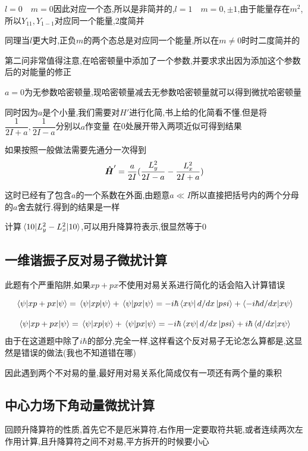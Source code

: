 \documentclass{article}
\begin{document}
            $l=0 \quad m=0$因此对应一个态,所以是非简并的,$ l = 1 \quad m =0,\pm 1 $,由于能量存在$m^{2}$,所以$Y_{11},Y_{1-1}$对应同一个能量,2度简并
            
            同理当$l$更大时,正负$m$的两个态总是对应同一个能量,所以在$m \neq 0$时时二度简并的
            
            第二问非常值得注意,在哈密顿量中添加了一个参数,并要求求出因为添加这个参数后的对能量的修正

            $a=0$为无参数哈密顿量,现哈密顿量减去无参数哈密顿量就可以得到微扰哈密顿量

            同时因为$a$是个小量,我们需要对$H'$进行化简,书上给的化简看不懂.但是将$ \dfrac{1}{2I+a},\dfrac{1}{2I-a}$分别以$a$作变量
            在0处展开带入两项近似可得到结果

            如果按照一般做法需要先通分一次得到
            $$ \vu*{H}' = \frac{a}{2I} ( \frac{L_{y}^{2}}{2I-a} -  \frac{L_{x}^{2}}{2I+a}) $$
            
            这时已经有了包含$a$的一个系数在外面,由题意$a \ll I $所以直接把括号内的两个分母的$a$舍去就行.得到的结果是一样
            
            计算$ \mel{10}{L_{y}^{2} - L_{x}^{2}}{10} $,可以用升降算符表示,很显然等于0
        
        \subsection{一维谐振子反对易子微扰计算}
            此题有个严重陷阱,如果$xp+px$不使用对易关系进行简化的话会陷入计算错误

            $$ 
            \mel{\psi}{xp+px}{\psi} = \mel{\psi}{xp}{\psi}+\mel{\psi}{px}{\psi} 
            = -i\hbar \bra{x\psi}d/dx \ket{psi} + \bra{-i\hbar d/dx}\ket{x\psi} 
            $$

            $$
            \mel{\psi}{xp+px}{\psi} = \mel{\psi}{xp}{\psi}+\mel{\psi}{px}{\psi} 
            = -i\hbar \bra{x\psi}d/dx \ket{psi} + i \hbar \bra{d/dx}\ket{x\psi} 
            $$
            由于在这道题中除了$i \hbar$的部分,完全一样,这样看这个反对易子无论怎么算都是,这显然是错误的做法(我也不知道错在哪)

            因此遇到两个不对易的量,最好用对易关系化简成仅有一项还有两个量的乘积

        \subsection{中心力场下角动量微扰计算}
            回顾升降算符的性质,首先它不是厄米算符,右作用一定要取符共轭,或者连续两次左作用计算,且升降算符之间不对易,平方拆开的时候要小心
        
\end{document}
